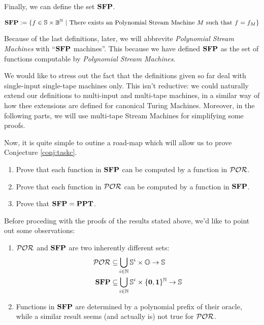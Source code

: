 \begin{conditional}{\notappendix}
    Finally, we can define the set $\SFP$.

    \begin{defn}[$\SFP$]
      \[
      \mathbf{SFP} := \{ f \in \mathbb{S} \times \mathbb{B}^{\mathbb{N}}~|~ \text{There exists an Polynomial Stream
      Machine $M$ such that }f=f_M\}
      \]
    \end{defn}

    Because of the last definitions, later, we will abbrevite
    \emph{Polynomial Stream Machines} with ``$\SFP$ machines''.
    This because we have defined $\SFP$ as the set of
    functions computable by \emph{Polynomial Stream Machines}.

    We would like to stress out the fact that the definitions given so far
    deal with single-input
    single-tape machines only. This isn't reductive: we could naturally extend our
    definitions to multi-input and multi-tape machines, in a similar way of how
    thee extensions are defined for canonical Turing Machines.
    Moreover, in the following parts, we will use multi-tape Stream Machines for
    simplifying some proofs.

    Now, it is quite simple to outine a road-map which will allow us to prove
    Conjecture \ref{conj:taskc}.

    \begin{enumerate}
      \item Prove that each function in $\SFP$ can be computed by a function in $\mathcal{POR}$.
      \item Prove that each function in $\mathcal{POR}$ can be computed by a function in $\SFP$.
      \item Prove that $\mathbf{SFP}=\mathbf{PPT}$.
    \end{enumerate}


\begin{comment}
    \noindent
    The desired result can be now stated as:


    \begin{lemma}
    For every deterministic $\SFP$-machine,
    $M := \langle \Qs, \Sigma, \delta,q_0\rangle$,
    there exists a $\POR$-function $f$, such that:
    $$
    f(\sigma,\eta)= M.
    $$
    \end{lemma}
\end{comment}

  Before proceding with the proofs of the results stated above, we'd like to
  point out some observations:

  \begin{enumerate}
    \item $\mathcal{POR}$ and $\SFP$ are two inherently different sets:
    \begin{align*}
      \mathcal{POR} \subseteq & \bigcup_{i \in \mathbb{N}} \mathbb{S}^i\times \mathbb{O} \to \mathbb{S}\\
      \mathbf{SFP} \subseteq & \bigcup_{i \in \mathbb{N}} \mathbb{S}^i\times \{\mathbf{0}, \mathbf{1}\}^{\mathbb{N}} \to \mathbb{S}
    \end{align*}
    \item Functions in $\SFP$ are determined by a polynomial prefix of their oracle,
    while a similar result seems (and actually is) not true for $\mathcal{POR}$.
  \end{enumerate}


\end{conditional}
